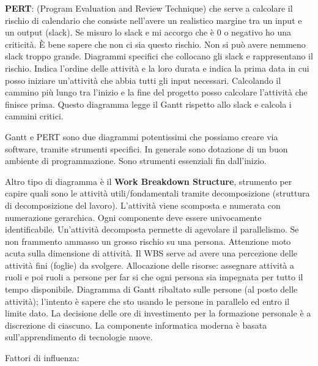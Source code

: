 \textbf{PERT}: (Program Evaluation and Review Technique) che serve a calcolare il rischio di calendario che consiste nell'avere un realistico margine tra un input e un output (slack). Se misuro lo slack e mi accorgo che è 0 o negativo ho una criticità. È bene sapere che non ci sia questo rischio. Non si può avere nemmeno slack troppo grande. Diagrammi specifici che collocano gli slack e rappresentano il rischio. Indica l'ordine delle attività e la loro durata e indica la prima data in cui posso iniziare un'attività che abbia tutti gli input necessari. Calcolando il cammino più lungo tra l'inizio e la fine del progetto posso calcolare l'attività che finisce prima. Questo diagramma legge il Gantt rispetto allo slack e calcola i cammini critici. 

Gantt e PERT sono due diagrammi potentissimi che possiamo creare via software, tramite strumenti specifici. In generale sono dotazione di un buon ambiente di programmazione. Sono strumenti essenziali fin dall'inizio.

Altro tipo di diagramma è il \textbf{Work Breakdown Structure}, strumento per capire quali sono le attività utili/fondamentali tramite decomposizione (struttura di decomposizione del lavoro). L'attività viene scomposta e numerata con numerazione gerarchica. Ogni componente deve essere univocamente identificabile. Un'attività decomposta permette di agevolare il parallelismo. Se non frammento ammasso un grosso rischio su una persona. Attenzione moto acuta sulla dimensione di attività. Il WBS serve ad avere una percezione delle attività fini (foglie) da svolgere. Allocazione delle risorse: assegnare attività a ruoli e poi ruoli a persone per far si che ogni persona sia impegnata per tutto il tempo disponibile. Diagramma di Gantt ribaltato sulle persone (al posto delle attività); l'intento è sapere che sto usando le persone in parallelo ed entro il limite dato. La decisione delle ore di investimento per la formazione personale è a discrezione di ciascuno. La componente informatica moderna è basata sull'apprendimento di tecnologie nuove.

Fattori di influenza:

